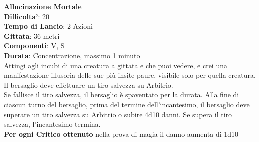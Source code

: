 \begin{multicols}{2}
\medskip\textbf{Allucinazione Mortale}\\
\textbf{Difficolta'}: 20\\
\textbf{Tempo di Lancio}: 2 Azioni\\
\textbf{Gittata}: 36 metri\\
\textbf{Componenti}: V, S\\
\textbf{Durata}: Concentrazione, massimo 1 minuto\\
Attingi agli incubi di una creatura a gittata e che puoi vedere, e crei una manifestazione illusoria delle sue più insite paure, visibile solo per quella creatura. Il bersaglio deve effettuare un tiro salvezza su Arbitrio.\\
Se fallisce il tiro salvezza, il bersaglio è spaventato per la durata. Alla fine di ciascun turno del bersaglio, prima del termine dell’incantesimo, il bersaglio deve superare un tiro salvezza su Arbitrio o subire 4d10 danni. Se supera il tiro salvezza, l’incantesimo termina.\\
\textbf{Per ogni Critico ottenuto} nella prova di magia il danno aumenta di 1d10


\end{multicols}
